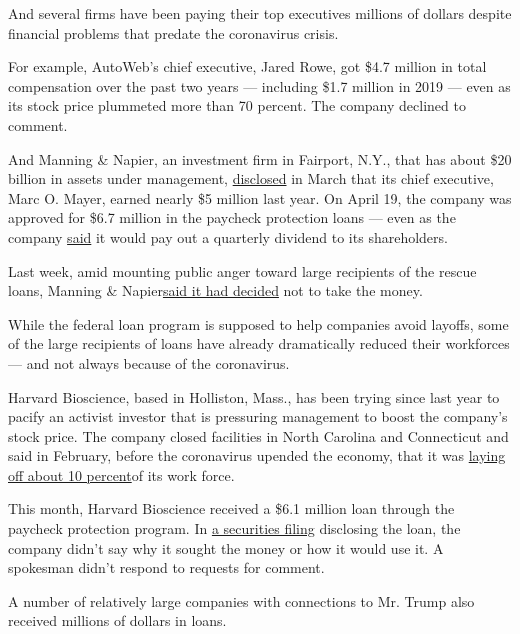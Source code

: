 And several firms have been paying their top executives millions of
dollars despite financial problems that predate the coronavirus crisis.

For example, AutoWeb's chief executive, Jared Rowe, got \$4.7 million in
total compensation over the past two years --- including \$1.7 million
in 2019 --- even as its stock price plummeted more than 70 percent. The
company declined to comment.

And Manning \& Napier, an investment firm in Fairport, N.Y., that has
about \$20 billion in assets under management,
\href{https://www.sec.gov/Archives/edgar/data/1524223/000152422320000015/mn201910-k_12312019.htm}{disclosed}
in March that its chief executive, Marc O. Mayer, earned nearly \$5
million last year. On April 19, the company was approved for \$6.7
million in the paycheck protection loans --- even as the company
\href{https://productionmn.blob.core.windows.net/media/Default/newsroom/2020/Manning\%20\%20Napier,\%20Inc.\%20Provides\%20Updates.pdf}{said}
it would pay out a quarterly dividend to its shareholders.

Last week, amid mounting public anger toward large recipients of the
rescue loans, Manning \&
Napier\href{https://www.sec.gov/Archives/edgar/data/1524223/000119312520118108/d885193dex991.htm}{said
it had decided} not to take the money.

While the federal loan program is supposed to help companies avoid
layoffs, some of the large recipients of loans have already dramatically
reduced their workforces --- and not always because of the coronavirus.

Harvard Bioscience, based in Holliston, Mass., has been trying since
last year to pacify an activist investor that is pressuring management
to boost the company's stock price. The company closed facilities in
North Carolina and Connecticut and said in February, before the
coronavirus upended the economy, that it was
\href{https://finance.yahoo.com/news/harvard-bioscience-announces-fourth-quarter-121510013.html}{laying
off about 10 percent}of its work force.

This month, Harvard Bioscience received a \$6.1 million loan through the
paycheck protection program. In
\href{https://www.sec.gov/Archives/edgar/data/1123494/000117184320002798/f8k_042220.htm}{a
securities filing} disclosing the loan, the company didn't say why it
sought the money or how it would use it. A spokesman didn't respond to
requests for comment.

A number of relatively large companies with connections to Mr. Trump
also received millions of dollars in loans.

